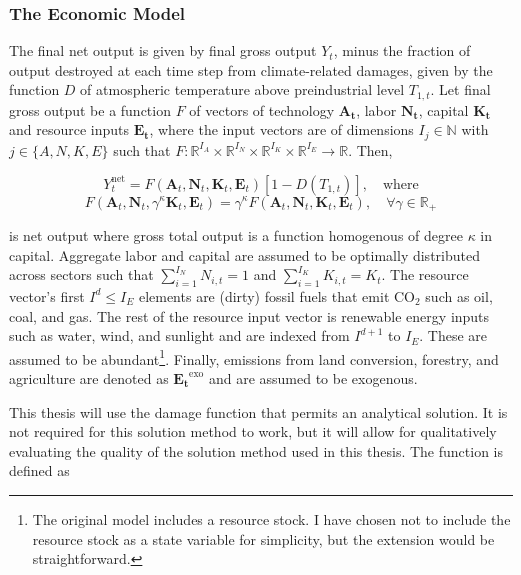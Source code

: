 \subsubsection{The Economic Model}

The final net output is given by final gross output \(Y_t\), minus the fraction of output destroyed at each time step from climate-related damages, given by the function \(D\) of atmospheric temperature above preindustrial level \(T_{1,t}\). Let final gross output be a function \(F\) of vectors of technology \(\bm{A_t}\), labor \(\bm{N_t}\), capital \(\bm{K_t}\) and resource inputs \(\bm{E_t}\), where the input vectors are of dimensions \(I_j \in \mathbb{N}\) with \(j \in \{A,N,K,E\}\) such that \(F: \mathbb{R}^{I_A} \times \mathbb{R}^{I_N} \times \mathbb{R}^{I_K} \times \mathbb{R}^{I_E} \to \mathbb{R}\). Then,

\begin{equation}
    Y_t^{\text{net}} = F(\bm{A}_t,\bm{N}_t,\bm{K}_t,\bm{E}_t)
    [1-D(T_{1,t})], \quad \text{where}
\end{equation}
\begin{equation*}
    F(\bm{A}_t,\bm{N}_t, \gamma^\kappa\bm{K}_t,\bm{E}_t) = 
    \gamma^\kappa F(\bm{A}_t,\bm{N}_t,\bm{K}_t,\bm{E}_t),
    \quad \forall \gamma \in \mathbb{R}_+
\end{equation*}

is net output where gross total output is a function homogenous of degree \(\kappa\) in capital. Aggregate labor and capital are assumed to be optimally distributed across sectors such that \(\sum_{i=1}^{I_N}N_{i,t} = 1\) and \(\sum_{i=1}^{I_K}K_{i,t} = K_t\). The resource vector's first \(I^d \leq I_E\) elements are (dirty) fossil fuels that emit CO$_2$ such as oil, coal, and gas. The rest of the resource input vector is renewable energy inputs such as water, wind, and sunlight and are indexed from \(I^{d+1}\) to \(I_E\). These are assumed to be abundant\footnote{The original model includes a resource stock. I have chosen not to include the resource stock as a state variable for simplicity, but the extension would be straightforward.}. Finally, emissions from land conversion, forestry, and agriculture are denoted as \(\bm{E_t}^{\text{exo}}\) and are assumed to be exogenous.

This thesis will use the damage function that permits an analytical solution. It is not required for this solution method to work, but it will allow for qualitatively evaluating the quality of the solution method used in this thesis. The function is defined as

